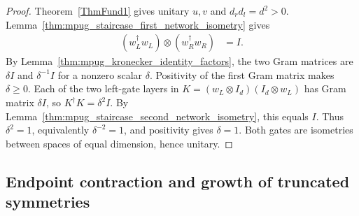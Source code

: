 \begin{proof}\leanok
    Theorem~\ref{ThmFund1} gives unitary $u,v$ and $d_rd_l=d^2>0$.
    Lemma~\ref{thm:mpug_staircase_first_network_isometry} gives
    \begin{align}
        (w_L^\dagger w_L)\otimes(w_R^\dagger w_R) & =I.
    \end{align}
    By Lemma~\ref{thm:mpug_kronecker_identity_factors}, the two Gram
    matrices are $\delta I$ and $\delta^{-1}I$ for a nonzero scalar
    $\delta$. Positivity of the first Gram matrix makes $\delta\geq0$.
    Each of the two left-gate layers in
    $K=(w_L\otimes I_d)(I_d\otimes w_L)$ has Gram matrix $\delta I$,
    so $K^\dagger K=\delta^2 I$. By
    Lemma~\ref{thm:mpug_staircase_second_network_isometry}, this equals
    $I$. Thus $\delta^2=1$, equivalently $\delta^{-2}=1$, and positivity
    gives $\delta=1$. Both gates are isometries between spaces of equal
    dimension, hence unitary.
\end{proof}

\subsection{Endpoint contraction and growth of truncated symmetries}


